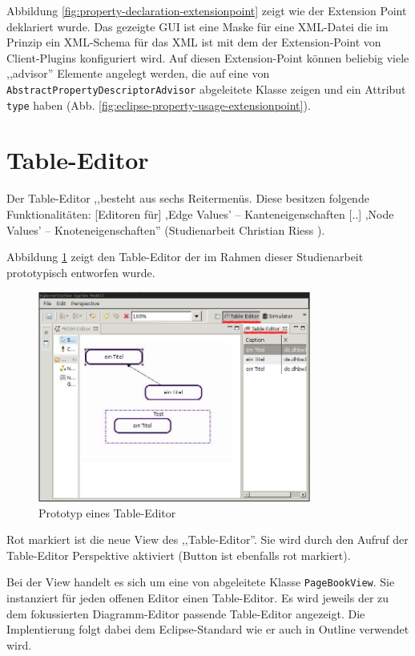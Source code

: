 \documentclass[%
12pt,titlepage,abstracton,DIV=10,BCOR=0.5cm]{scrreprt}
\begin{document}
Abbildung \ref{fig:property-declaration-extensionpoint} zeigt wie der Extension
Point deklariert wurde. Das gezeigte GUI ist eine Maske für eine XML-Datei die
im Prinzip ein XML-Schema für das XML ist mit dem der Extension-Point von
Client-Plugins konfiguriert wird. Auf diesen Extension-Point können beliebig
viele ,,advisor'' Elemente angelegt werden, die auf eine von
\texttt{Abstract\-Property\-Descriptor\-Advisor} abgeleitete Klasse zeigen und
ein Attribut \texttt{type} haben (Abb.
\ref{fig:eclipse-property-usage-extensionpoint}).


\section{Table-Editor}
Der Table-Editor ,,besteht aus sechs Reitermenüs. Diese besitzen folgende
Funktionalitäten: [Editoren für] ,Edge Values' – Kanteneigenschaften [..]
,Node Values' – Knoteneigenschaften'' (Studienarbeit Christian Riess \cite[S.
24]{riess03}).

Abbildung \ref{fig:table-editor} zeigt den Table-Editor der im Rahmen dieser
Studienarbeit prototypisch entworfen wurde.

\begin{figure}[ht]
\centering
\includegraphics[width=0.8\textwidth]{images/table-editor.jpg}
\caption{Prototyp eines Table-Editor}
\label{fig:table-editor}
\end{figure}

Rot markiert ist die neue View des ,,Table-Editor''. Sie wird durch den Aufruf
der Table-Editor Perspektive aktiviert (Button ist ebenfalls rot markiert).

Bei der View handelt es sich um eine von abgeleitete Klasse
\texttt{PageBookView}. Sie instanziert für jeden offenen Editor einen
Table-Editor. Es wird jeweils der zu dem fokussierten Diagramm-Editor passende
Table-Editor angezeigt. Die Implentierung folgt dabei dem Eclipse-Standard wie
er auch in Outline verwendet wird.
\end{document}
